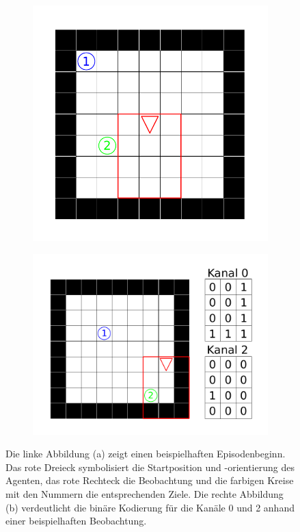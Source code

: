 \begin{figure}[ht!]
  \begin{subfigure}[c]{0.45\textwidth}
    \includegraphics[keepaspectratio,width=\textwidth]{abbildungen/9x9_ep_start.pdf}
    \subcaption{}
    \label{fig_9x9_ep_start}
  \end{subfigure}
  \begin{subfigure}[c]{0.6\textwidth}
    \includegraphics[keepaspectratio,width=\textwidth]{abbildungen/9x9_sample_obs.pdf}
    \subcaption{}
    \label{fig_9x9_sample_obs}
  \end{subfigure}
  \caption{Die linke Abbildung (a) zeigt einen beispielhaften Episodenbeginn. Das rote Dreieck symbolisiert die Startposition und -orientierung des Agenten, das rote Rechteck die Beobachtung und die farbigen Kreise mit den Nummern die entsprechenden Ziele. Die rechte Abbildung (b) verdeutlicht die binäre Kodierung für die Kanäle 0 und 2 anhand einer beispielhaften Beobachtung.}
\end{figure}

